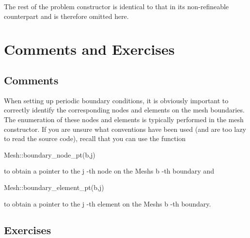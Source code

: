 The rest of the problem constructor is identical to that in its non-\/refineable counterpart and is therefore omitted here.



 

\hypertarget{index_comments}{}\section{Comments and Exercises}\label{index_comments}
\hypertarget{index_nondim}{}\subsection{Comments}\label{index_nondim}
When setting up periodic boundary conditions, it is obviously important to correctly identify the corresponding nodes and elements on the mesh boundaries. The enumeration of these nodes and elements is typically performed in the mesh constructor. If you are unsure what conventions have been used (and are too lazy to read the source code), recall that you can use the function 
\begin{DoxyCode}
Mesh::boundary\_node\_pt(b,j)
\end{DoxyCode}
 to obtain a pointer to the {\ttfamily j} -\/th node on the {\ttfamily Mesh\textquotesingle{}s} {\ttfamily b} -\/th boundary and 
\begin{DoxyCode}
Mesh::boundary\_element\_pt(b,j)
\end{DoxyCode}
 to obtain a pointer to the {\ttfamily j} -\/th element on the {\ttfamily Mesh\textquotesingle{}s} {\ttfamily b} -\/th boundary.\hypertarget{index_exercises}{}\subsection{Exercises}\label{index_exercises}

